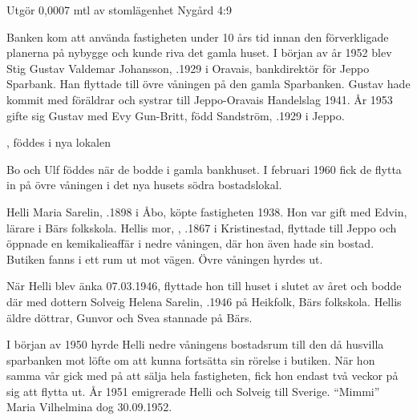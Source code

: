 %

Utgör 0,0007 mtl av stomlägenhet Nygård 4:9

%
Banken kom att använda fastigheten under 10 års tid innan den förverkligade planerna på nybygge och kunde riva det gamla huset. I början av år 1952 blev Stig Gustav Valdemar Johansson, .1929 i Oravais, bankdirektör för Jeppo Sparbank. Han flyttade till övre våningen på den gamla Sparbanken. Gustav hade kommit med föräldrar och systrar till Jeppo-Oravais Handelslag 1941. År 1953 gifte sig Gustav med Evy Gun-Britt, född Sandström, .1929 i Jeppo.
\begin{jhchildren}
  \item {}
  \item {}
  \item {}, föddes i nya lokalen
\end{jhchildren}
Bo och Ulf föddes när de bodde i gamla bankhuset. I februari 1960 fick de flytta in på övre våningen i det nya husets södra bostadslokal.


%
Helli Maria Sarelin, .1898 i Åbo, köpte fastigheten 1938. Hon var gift med Edvin, lärare i Bärs folkskola. Hellis mor, , .1867 i Kristinestad, flyttade till Jeppo och öppnade en kemikalieaffär i nedre våningen, där hon även hade sin bostad. Butiken fanns i ett rum ut mot vägen. Övre våningen hyrdes ut.

När Helli blev änka 07.03.1946, flyttade hon till huset i slutet av året och bodde där med dottern Solveig Helena Sarelin, .1946 på Heikfolk, Bärs folkskola. Hellis äldre döttrar, Gunvor och Svea stannade på Bärs.

I början av 1950 hyrde Helli nedre våningens bostadsrum till den då husvilla sparbanken mot löfte om att kunna fortsätta sin rörelse i butiken. När hon samma vår gick med på att sälja hela fastigheten, fick hon endast två veckor på sig att flytta ut. År 1951 emigrerade Helli och Solveig till Sverige. ``Mimmi'' Maria Vilhelmina dog 30.09.1952.

